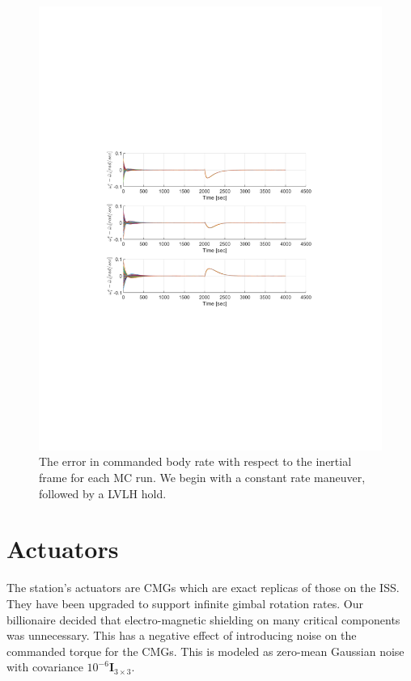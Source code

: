 \documentclass[]{article}
\begin{document}
\begin{figure}[!h]
	\centering
	\includegraphics[width=\linewidth,trim={4cm, 8cm, 4cm, 8cm},clip]{figs/MC_rate_command_perf.pdf}
	\caption{The error in commanded body rate with respect to the inertial frame for each MC run. We begin with a constant rate maneuver, followed by a LVLH hold.}
	\label{fig:MC_rate_command_perf.pdf}
\end{figure}


\section{Actuators}

The station's actuators are CMGs which are exact replicas of those on the ISS. They have been upgraded to support infinite gimbal rotation rates. Our billionaire decided that electro-magnetic shielding on many critical components was unnecessary. This has a negative effect of introducing noise on the commanded torque for the CMGs. This is modeled as zero-mean Gaussian noise with covariance $10^{-6}\bm{I}_{3 \times 3}$.
\end{document}
